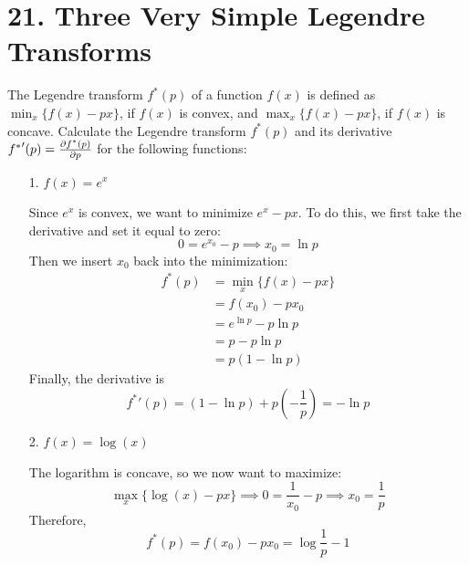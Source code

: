\documentclass[a4paper,twoside]{article}
\begin{document}
\section*{21. Three Very Simple Legendre Transforms}
The Legendre transform $ f^*(p) $ of a function $ f(x) $ is defined as $ \min_x \{f(x) - px\} $, if $ f(x) $ is convex, and $ \max_x \{f(x) - px\} $, if $ f(x) $ is concave. Calculate the Legendre transform $ f^*(p) $ and its derivative $ {f^*}'(p) = \pdv{f^*(p)}{p} $ for the following functions:
\begin{itemize}
    \item[1.] $ f(x) = e^x $
        \begin{problem}
            Since $ e^x $ is convex, we want to minimize $ e^x - px $. To do this, we first take the derivative and set it equal to zero:
            \begin{equation}
                0 = e^{x_0} - p \implies x_0 = \ln{p}
            \end{equation}
            Then we insert $ x_0 $ back into the minimization:
            \begin{align}
                f^*(p) &= \min_x \{f(x) - px\} \\
                &= f(x_0) - px_0 \\
                &= e^{\ln{p}} -p \ln{p} \\
                &= p - p \ln{p} \\
                &= p(1 - \ln{p})
            \end{align}
            Finally, the derivative is
            \begin{equation}
                {f^*}'(p) = (1 - \ln{p}) + p \left( - \frac{1}{p} \right) = - \ln{p}
            \end{equation}
        \end{problem}
    \item[2.] $ f(x) = \log(x) $
        \begin{problem}
            The logarithm is concave, so we now want to maximize:
            \begin{equation}
                \max_x \{\log(x) - px\} \implies 0 = \frac{1}{x_0} - p \implies x_0 = \frac{1}{p}
            \end{equation}
            Therefore,
            \begin{equation}
                f^*(p) = f(x_0) - p x_0 = \log{\frac{1}{p}} - 1
            \end{equation}
            \begin{equation}

\end{equation}
\end{problem}
\end{itemize}
\end{document}
